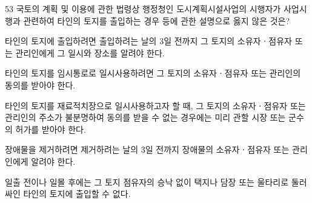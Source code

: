 \begin{question}{53}
국토의 계획 및 이용에 관한 법령상 행정청인 도시계획시설사업의 시행자가 사업시행과 관련하여 타인의 토지를 출입하는 경우 등에 관한 설명으로 옳지 않은 것은?
\begin{choices}
  \item 타인의 토지에 출입하려면 출입하려는 날의 3일 전까지 그 토지의 소유자ㆍ점유자 또는 관리인에게 그 일시와 장소를 알려야 한다.
  \item 타인의 토지를 임시통로로 일시사용하려면 그 토지의 소유자ㆍ점유자 또는 관리인의 동의를 받아야 한다.
  \item 타인의 토지를 재료적치장으로 일시사용하고자 할 때, 그 토지의 소유자ㆍ점유자 또는 관리인의 주소가 불분명하여 동의를 받을 수 없는 경우에는 미리 관할 시장 또는 군수의 허가를 받아야 한다.
  \item 장애물을 제거하려면 제거하려는 날의 3일 전까지 장애물의 소유자ㆍ점유자 또는 관리인에게 알려야 한다.
  \item 일출 전이나 일몰 후에는 그 토지 점유자의 승낙 없이 택지나 담장 또는 울타리로 둘러싸인 타인의 토지에 출입할 수 없다.
\end{choices}
\end{question}
